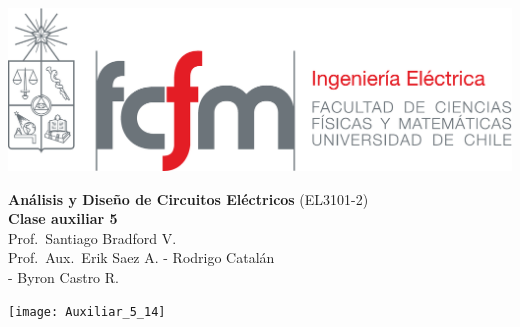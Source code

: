 \documentclass[
  11pt,
  letterpaper,
   addpoints,
   answers
  ]{exam}
\begin{document}
\noindent
\begin{minipage}{0.47\textwidth}
\includegraphics[width=\textwidth]{../fcfm_die}
\end{minipage}
\begin{minipage}{0.53\textwidth}
    
\begin{center} 
\large\textbf{Análisis y Diseño de Circuitos Eléctricos} (EL3101-2) \\
\large\textbf{Clase auxiliar 5} \\
\normalsize Prof.~Santiago Bradford V.\\
\normalsize Prof.~Aux.~Erik Saez A. - Rodrigo Catalán\\
             - Byron Castro R.
\end{center}
\end{minipage}

\vspace{0.5cm}
\noindent
\vspace{.85cm}

\begin{center}
    \texttt{[image: Auxiliar\_5\_14]}
\end{center}
\end{document}
